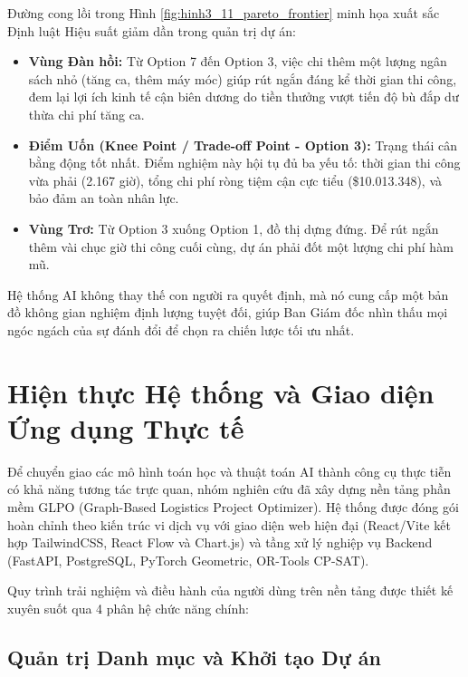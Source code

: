 Đường cong lồi trong Hình \ref{fig:hinh3_11_pareto_frontier} minh họa xuất sắc Định luật Hiệu suất giảm dần trong quản trị dự án:
\begin{itemize}
    \item \textbf{Vùng Đàn hồi:} Từ Option 7 đến Option 3, việc chi thêm một lượng ngân sách nhỏ (tăng ca, thêm máy móc) giúp rút ngắn đáng kể thời gian thi công, đem lại lợi ích kinh tế cận biên dương do tiền thưởng vượt tiến độ bù đắp dư thừa chi phí tăng ca.
    \item \textbf{Điểm Uốn (Knee Point / Trade-off Point - Option 3):} Trạng thái cân bằng động tốt nhất. Điểm nghiệm này hội tụ đủ ba yếu tố: thời gian thi công vừa phải (2.167 giờ), tổng chi phí ròng tiệm cận cực tiểu (\$10.013.348), và bảo đảm an toàn nhân lực.
    \item \textbf{Vùng Trơ:} Từ Option 3 xuống Option 1, đồ thị dựng đứng. Để rút ngắn thêm vài chục giờ thi công cuối cùng, dự án phải đốt một lượng chi phí hàm mũ.
\end{itemize}
Hệ thống AI không thay thế con người ra quyết định, mà nó cung cấp một bản đồ không gian nghiệm định lượng tuyệt đối, giúp Ban Giám đốc nhìn thấu mọi ngóc ngách của sự đánh đổi để chọn ra chiến lược tối ưu nhất.

\section{Hiện thực Hệ thống và Giao diện Ứng dụng Thực tế}
\label{sec:3.5_he_thong_giao_dien}

Để chuyển giao các mô hình toán học và thuật toán AI thành công cụ thực tiễn có khả năng tương tác trực quan, nhóm nghiên cứu đã xây dựng nền tảng phần mềm GLPO (Graph-Based Logistics Project Optimizer). Hệ thống được đóng gói hoàn chỉnh theo kiến trúc vi dịch vụ với giao diện web hiện đại (React/Vite kết hợp TailwindCSS, React Flow và Chart.js) và tầng xử lý nghiệp vụ Backend (FastAPI, PostgreSQL, PyTorch Geometric, OR-Tools CP-SAT). 

Quy trình trải nghiệm và điều hành của người dùng trên nền tảng được thiết kế xuyên suốt qua 4 phân hệ chức năng chính:

\subsection{Quản trị Danh mục và Khởi tạo Dự án}
\label{sec:3.5.1_portfolio_overview}

